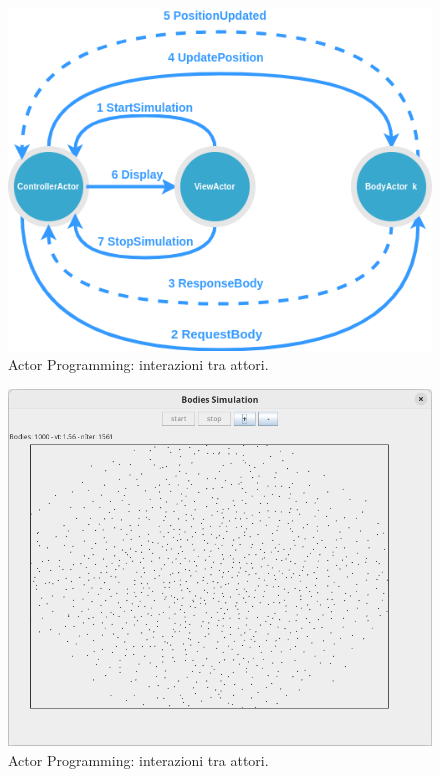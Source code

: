 \documentclass[12pt,a4paper,openright,twoside]{book}
\begin{document}
\begin{figure}[H]
	\centering
	\includegraphics[width=\textwidth]{figures/actor-programming-interaction.png}
	\caption{Actor Programming: interazioni tra attori.}
	\label{fig:api}
\end{figure}
\begin{figure}[H]
	\centering
	\includegraphics[width=\textwidth]{figures/actor-programming-simulation.png}
	\caption{Actor Programming: interazioni tra attori.}
	\label{fig:apgui}
\end{figure}
\end{document}
